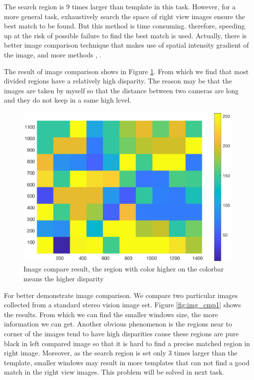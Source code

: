 The search region is 9 times larger than template in this task. However, for a more general task, exhaustively search the space of right view images ensure the best match to be found. But this method is time consuming. therefore, speeding up at the risk of possible failure to find the best match is used. Actually, there is better image comparison technique that makes use of spatial intensity gradient of the image\cite{Lucas1981An}, and more methods \cite{Marr1988A}, \cite{Moravec1980Obstacle}.

The result of image comparison shows in Figure \ref{fig:img_cmp}. From which we find that most divided regions have a relatively high disparity. The reason may be that the images are taken by myself so that the distance between two cameras are long and they do not keep in a same high level.

\begin{figure}[h!]
	\centering
	\includegraphics[width=0.5\linewidth]{figures/part2/img_cmp}
	\caption{Image compare result, the region with color higher on the colorbar means the higher disparity}
	\label{fig:img_cmp}
\end{figure}

For better demonstrate image comparison. We compare two particular images collected from a standard stereo vision image set. Figure \ref{fig:img_cmp1} shows the results. From which we can find the smaller windows size, the more information we can get. Another obvious phenomenon is the regions near to corner of the images tend to have high disparities cause these regions are pure black in left compared image so that it is hard to find a precise matched region in right image. Moreover, as the search region is set only 3 times larger than the template, smaller windows may result in more templates that can not find a good match in the right view images. This problem will be solved in next task.

